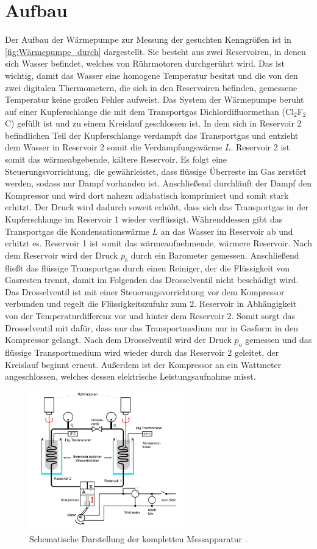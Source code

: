 \section{Aufbau}
\label{sec:Aufbau}
Der Aufbau der Wärmepumpe zur Messung der gesuchten Kenngrößen ist in \autoref{fig:Wärmepumpe_durch} dargestellt.
Sie besteht aus zwei Reservoiren, in denen sich Wasser befindet, welches von Rührmotoren durchgerührt wird. 
Das ist wichtig, damit das Wasser eine homogene Temperatur besitzt und die von den zwei digitalen Thermometern, die sich in den Reservoiren befinden,
gemessene Temperatur keine großen Fehler aufweist.
Das System der Wärmepumpe beruht auf einer Kupferschlange die mit dem Transportgas Dichlordifluormethan (Cl$_2$F$_2$C) gefüllt ist und zu einem Kreislauf
geschlossen ist. 
In dem sich in Reservoir 2 befindlichen Teil der Kupferschlange verdampft das Transportgas und entzieht dem Wasser in Reservoir 2 
somit die Verdampfungswärme $L$.
Reservoir 2 ist somit das wärmeabgebende, kältere Reservoir.
Es folgt eine Steuerungsvorrichtung, die gewährleistet, dass flüssige Überreste im Gas zerstört werden, sodass nur Dampf vorhanden ist.
Anschließend durchläuft der Dampf den Kompressor und wird dort nahezu adiabatisch komprimiert und somit stark erhitzt.
Der Druck wird dadurch soweit erhöht, dass sich das Transportgas in der Kupferschlange im Reservoir 1 wieder verflüssigt.
Währenddessen gibt das Transportgas die Kondensationswärme $L$ an das Wasser im Reservoir ab und erhitzt es. Reservoir 1 ist somit das wärmeaufnehmende,
wärmere Reservoir.
Nach dem Reservoir wird der Druck $p_b$ durch ein Barometer gemessen. 
Anschließend fließt das flüssige Transportgas durch einen Reiniger, der die Flüssigkeit von Gasresten trennt, damit im Folgenden das Drosselventil nicht beschädigt wird.
Das Drosselventil ist mit einer Steuerungsvorrichtung vor dem Kompressor verbunden und regelt die Flüssigkeitszufuhr zum 2. Reservoir in Abhängigkeit
von der Temperaturdifferenz vor und hinter dem Reservoir 2. Somit sorgt das Drosselventil mit dafür, dass nur das Transportmedium nur in Gasform in den
Kompressor gelangt.
Nach dem Drosselventil wird der Druck $p_a$ gemessen und das flüssige Transportmedium wird wieder durch das Reservoir 2 geleitet, der Kreislauf beginnt erneut.
Außerdem ist der Kompressor an ein Wattmeter angeschlossen, welches dessen elektrische Leistungsaufnahme misst.
\begin{figure}[H]
    \centering
    \includegraphics[width=0.6\textwidth]{build/Abb2.png}
    \caption{Schematische Darstellung der kompletten Messapparatur \cite[197]{V206}.}
    \label{fig:Wärmepumpe_durch}
\end{figure}
